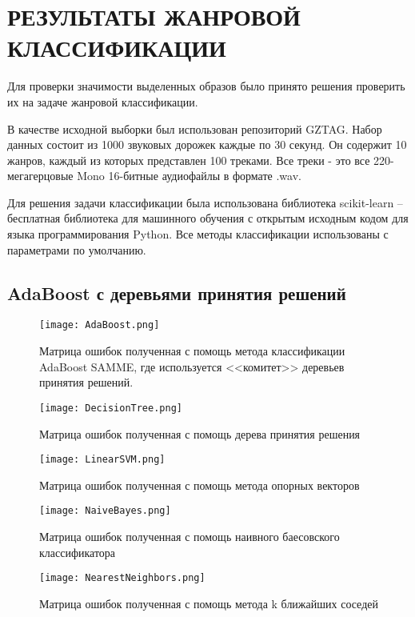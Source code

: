 \section{РЕЗУЛЬТАТЫ ЖАНРОВОЙ КЛАССИФИКАЦИИ}
\label{sec:genre_classification}


Для проверки значимости выделенных образов было принято решения проверить их на задаче жанровой классификации. 

В качестве исходной выборки был использован репозиторий GZTAG. Набор данных состоит из 1000 звуковых дорожек каждые по 30 секунд. Он содержит 10 жанров, каждый из которых представлен 100 треками. Все треки - это все 220-мегагерцовые Mono 16-битные аудиофайлы в формате .wav.


Для решения задачи классификации была использована библиотека scikit-learn -- бесплатная библиотека для машинного обучения с открытым исходным кодом для языка программирования Python. Все методы классификации использованы с параметрами по умолчанию. 

\subsection{AdaBoost с деревьями принятия решений}


\begin{figure}[h]
\centering
  \texttt{[image: AdaBoost.png]}
  \caption{Матрица ошибок полученная с помощь метода классификации AdaBoost SAMME, где используется <<комитет>>  деревьев принятия решений.}
  \label{fig:results:adaboost}
\end{figure}


\begin{figure}[h]
\centering
  \texttt{[image: DecisionTree.png]}
  \caption{Матрица ошибок полученная с помощь дерева принятия решения}
  \label{fig:results:DecisionTree}
\end{figure}


\begin{figure}[h]
\centering
  \texttt{[image: LinearSVM.png]}
  \caption{Матрица ошибок полученная с помощь метода опорных векторов}
  \label{fig:results:LinearSVM}
\end{figure}


\begin{figure}[h]
\centering
  \texttt{[image: NaiveBayes.png]}
  \caption{Матрица ошибок полученная с помощь наивного баесовского классификатора}
  \label{fig:results:NaiveBayes}
\end{figure}

\begin{figure}[h]
\centering
  \texttt{[image: NearestNeighbors.png]}
  \caption{Матрица ошибок полученная с помощь метода k ближайших соседей}
  \label{fig:results:NearestNeighbors}
\end{figure}

